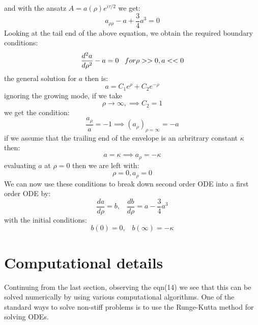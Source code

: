 \documentclass{article}
\begin{document}
and with the ansatz $A = a(\rho)e^{i\tau / 2}$ we get:
\begin{equation}
a_{\rho \rho} - a + \frac{3}{4}a^{3} = 0
\end{equation}
Looking at the tail end of the above equation, we obtain the required boundary conditions:
\begin{equation}
\frac{d^{2}a}{d\rho^{2}} - a =0 \;\;\; for \rho>>0, a<<0 \\
\end{equation}
the general solution for $a$ then is: 
$$a = C_{1}e^{\rho} + C_{2}e^{-\rho}$$
ignoring the growing mode, if we take $$\rho \to \infty , \implies C_{2} = 1$$
we get the condition:
$$\frac{a_{\rho}}{a}=-1 \implies (a_{\rho})_{\rho = \infty} = -a$$ 
if we assume that the trailing end of the envelope is an arbritrary constant $\kappa$ then: $$ a = \kappa \implies a_{\rho} = -\kappa$$
evaluating $a$ at $\rho =0$ then we are left with: $$\rho = 0, a_{\rho} = 0$$
We can now use these conditions to break down second order ODE into a first order ODE by:
\begin{equation}
\frac{da}{d\rho} = b , \;\;\;
\frac{db}{d\rho} = a - \frac{3}{4}a^{3}
\end{equation}
with the initial conditions:
$$b(0)=0, \;\;\; b(\infty) = -\kappa$$
\section{Computational details}
Continuing from the last section, observing the eqn(14) we see that this can be solved numerically by using various computational algorithms. One of the standard ways to solve non-stiff problems is to use the Runge-Kutta\cite{num-chapra}\cite{num-recepies} method for solving ODEs. 
\end{document}
